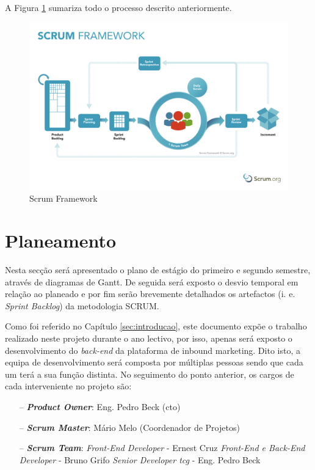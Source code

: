 A Figura \ref{fig:scrum} sumariza todo o processo descrito anteriormente.



\begin{figure}[ht!]
	\begin{center}
		\includegraphics[width=1\textwidth]{img/scrum.pdf}
		\caption{Scrum Framework\cite{scrumimg}}
		\label{fig:scrum}
	\end{center}
\end{figure}

\newpage

\section{Planeamento}
\label{planeamento}

Nesta secção será apresentado o plano de estágio do primeiro e segundo semestre, através de diagramas de Gantt.  De seguida será exposto o desvio temporal em relação ao planeado e por fim serão brevemente detalhados os artefactos (i. e. \textit{Sprint Backlog}) da metodologia SCRUM.

Como foi referido no Capítulo \ref{sec:introducao}, este documento expõe o trabalho realizado neste projeto durante o ano lectivo, por isso, apenas será exposto o desenvolvimento do \textit{back-end} da plataforma de inbound marketing. Dito isto, a equipa de desenvolvimento será composta por múltiplas pessoas sendo que cada um terá a sua função distinta.
No seguimento do ponto anterior, os cargos de cada interveniente no projeto são:
\begin{itemize}
	\item[--] \textbf{\textit{Product Owner}}: Eng. Pedro Beck (\acrfull{cto})
	\item[--] \textbf{\textit{Scrum Master}}: Mário Melo (Coordenador de Projetos)
	\item[--] \textbf{\textit{Scrum Team}}: 
	\subitem  \textit{Front-End Developer} - Ernest Cruz
	\subitem  \textit{Front-End e Back-End Developer} - Bruno Grifo
	\subitem  \textit{Senior Developer \acrshort{tcg}} - Eng. Pedro Beck
\end{itemize}

